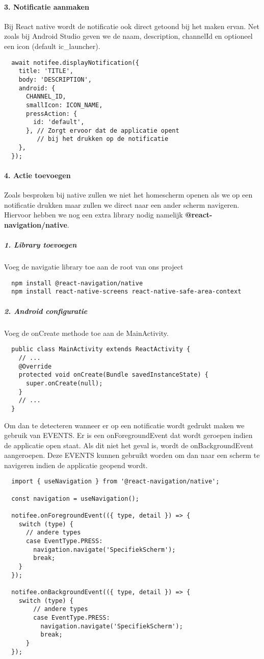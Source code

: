 \paragraph{3. Notificatie aanmaken}
Bij React native wordt de notificatie ook direct getoond bij het maken ervan. Net zoals bij Android Studio 
geven we de naam, description, channelId en optioneel een icon (default ic\_launcher). 
\begin{verbatim}
  await notifee.displayNotification({
    title: 'TITLE',
    body: 'DESCRIPTION',
    android: {
      CHANNEL_ID,
      smallIcon: ICON_NAME,
      pressAction: {
        id: 'default',
      }, // Zorgt ervoor dat de applicatie opent 
         // bij het drukken op de notificatie
    },
  });
\end{verbatim}

\paragraph{4. Actie toevoegen}
Zoals besproken bij native zullen we niet het homescherm openen als we op een notificatie drukken maar zullen we 
direct naar een ander scherm navigeren. Hiervoor hebben we nog een extra library nodig namelijk \textbf{@react-navigation/native}. 
\subparagraph{1. Library toevoegen} 
Voeg de navigatie library toe aan de root van ons project
\begin{verbatim}
  npm install @react-navigation/native
  npm install react-native-screens react-native-safe-area-context
\end{verbatim}

\subparagraph{2. Android configuratie} %
Voeg de onCreate methode toe aan de MainActivity.
\begin{verbatim}
  public class MainActivity extends ReactActivity {
    // ...
    @Override
    protected void onCreate(Bundle savedInstanceState) {
      super.onCreate(null);
    }
    // ...
  }
\end{verbatim}
Om dan te detecteren wanneer er op een notificatie wordt gedrukt maken we gebruik van EVENTS. Er is een onForegroundEvent 
dat wordt geroepen indien de applicatie open staat. Als dit niet het geval is, wordt de onBackgroundEvent 
aangeroepen. Deze EVENTS kunnen gebruikt worden om dan naar een scherm te navigeren indien de applicatie geopend wordt.
\begin{verbatim}
  import { useNavigation } from '@react-navigation/native';

  const navigation = useNavigation();

  notifee.onForegroundEvent(({ type, detail }) => {
    switch (type) {
      // andere types
      case EventType.PRESS:
        navigation.navigate('SpecifiekScherm'); 
        break;
    }
  });
  
  notifee.onBackgroundEvent(({ type, detail }) => {
    switch (type) {
        // andere types
        case EventType.PRESS:
          navigation.navigate('SpecifiekScherm'); 
          break;
      }
  });
\end{verbatim}

